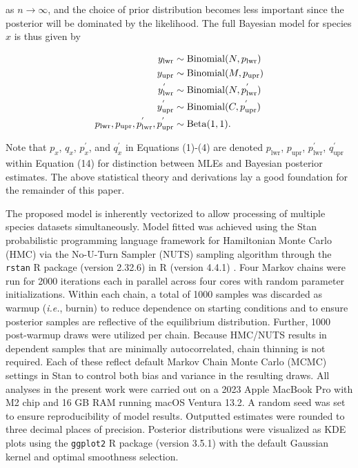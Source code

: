 \documentclass[12pt]{article}
\begin{document}
as $n \rightarrow \infty$, and the choice of prior distribution becomes less important since the posterior will be dominated by the likelihood. The full Bayesian model for species $x$ is thus given by

\begin{align}
\notag y_\mathrm{lwr} &\sim \mathrm{Binomial}(N, p_\mathrm{lwr}) \\ 
\notag y_\mathrm{upr} &\sim \mathrm{Binomial}(M, p_\mathrm{upr}) \\ 
y^{'}_\mathrm{lwr} &\sim \mathrm{Binomial}(N, p^{'}_\mathrm{lwr}) \\ 
 \notag y^{'}_\mathrm{upr} &\sim \mathrm{Binomial}(C, p^{'}_\mathrm{upr}) \\ 
\notag p_\mathrm{lwr}, p_\mathrm{upr}, p^{'}_\mathrm{lwr}, p^{'}_\mathrm{upr}
&\sim \mathrm{Beta}(1, 1).
\end{align}

\noindent Note that $p_x$, $q_x$, $p^{'}_x$, and $q^{'}_x$ in Equations (1)-(4) are denoted $p_\mathrm{lwr}$, $p_\mathrm{upr}$, $p^{'}_\mathrm{lwr}$, $q^{'}_\mathrm{upr}$ within Equation (14) for distinction between MLEs and Bayesian posterior estimates. The above statistical theory and derivations lay a good foundation for the remainder of this paper.

The proposed model is inherently vectorized to allow processing of multiple species datasets simultaneously. Model fitted was achieved using the Stan probabilistic programming language \citep{carpenter2017stan} framework for Hamiltonian Monte Carlo (HMC) via the No-U-Turn Sampler (NUTS) sampling algorithm \citep{hoffman2014no} through the {\tt rstan} R package (version 2.32.6) \citep{stan2023rstan} in R (version 4.4.1) \citep{rcore2024language}. Four Markov chains were run for 2000 iterations each in parallel across four cores with random parameter initializations. Within each chain, a total of 1000 samples was discarded as warmup (\textit{i.e.}, burnin) to reduce dependence on starting conditions and to ensure posterior samples are reflective of the equilibrium distribution. Further, 1000 post-warmup draws were utilized per chain. Because HMC/NUTS results in dependent samples that are minimally autocorrelated, chain thinning is not required. Each of these reflect default Markov Chain Monte Carlo (MCMC) settings in Stan to control both bias and variance in the resulting draws. All analyses in the present work were carried out on a 2023 Apple MacBook Pro with M2 chip and 16 GB RAM running macOS Ventura 13.2. A random seed was set to ensure reproducibility of model results. Outputted estimates were rounded to three decimal places of precision. Posterior distributions were visualized as KDE plots using the {\tt ggplot2} R package (version 3.5.1) \citep{wickham2016ggplot2} with the default Gaussian kernel and optimal smoothness selection.
\end{document}
